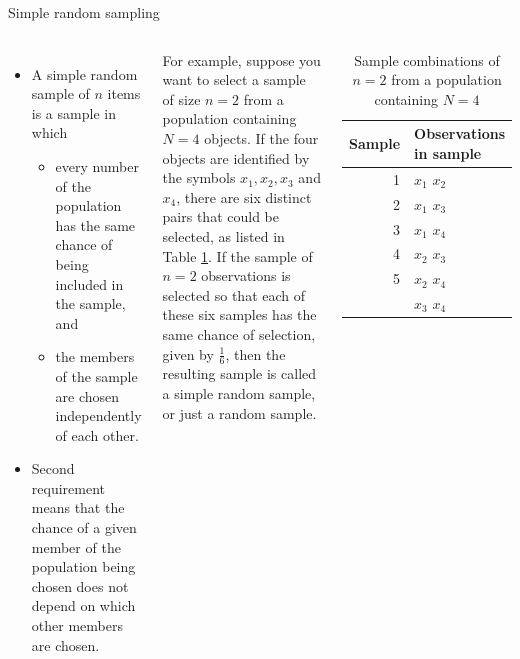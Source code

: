 \documentclass[
  ignorenonframetext,
  aspectratio=169]{beamer}
\begin{document}
\begin{frame}{Simple random sampling}
\protect\hypertarget{simple-random-sampling}{}
\begin{columns}[T,onlytextwidth]
\begin{itemize}
\small
\item A simple random sample of $n$ items is a sample in which 
  \begin{itemize}
  \small
  \item every number of the population has the same chance of being included in the sample, and 
  \item the members of the sample are chosen independently of each other.
  \end{itemize}
\item Second requirement means that the chance of a given member of the population being chosen does not depend on which other members are chosen.
\end{itemize}

\footnotesize
For example, suppose you want to select a sample of size $n = 2$ from a population containing $N = 4$ objects. If the four objects are identified by the symbols $x_1, x_2, x_3$ and $x_4$, there are six distinct pairs that could be selected, as listed in Table \ref{tab:srs-sample-space}. If the sample of $n = 2$ observations is selected so that each of these six samples has the same chance of selection, given by $\frac{1}{6}$, then the resulting sample is called a simple random sample, or just a random sample.


\begin{table}

\caption{\label{tab:srs-sample-space}Sample combinations of $n=2$ from a population containing $N=4$}
\centering
\fontsize{7}{9}\selectfont
\begin{tabular}[t]{rl}
\toprule
Sample & Observations in sample\\
\midrule
1 & $x_1$ $x_2$\\
2 & $x_1$ $x_3$\\
3 & $x_1$ $x_4$\\
4 & $x_2$ $x_3$\\
5 & $x_2$ $x_4$\\
\addlinespace
6 & $x_3$ $x_4$\\
\bottomrule
\end{tabular}
\end{table}

\end{columns}
\end{frame}
\end{document}
